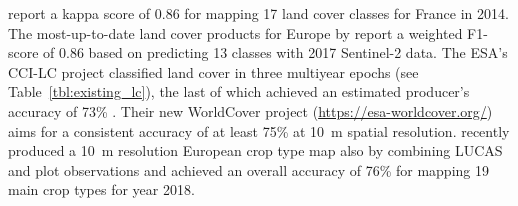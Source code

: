 \citet{inglada2017operational} report a kappa score of 0.86 for mapping 17 land cover classes for France in 2014. The most-up-to-date land cover products for Europe by \citet{malinowski2020} report a weighted F1-score of 0.86 based on predicting 13 classes with 2017 Sentinel-2 data. The ESA's CCI-LC project classified land cover in three multiyear epochs (see Table\@~\ref{tbl:existing_lc}), the last of which achieved an estimated producer's accuracy of 73\% \citep{arino2012global}. Their new WorldCover project (\url{https://esa-worldcover.org/}) aims for a consistent accuracy of at least 75\% at 10~m spatial resolution. \citet{dandrimont2021lucas} recently produced a 10~m resolution European crop type map also by combining LUCAS and plot observations and achieved an overall accuracy of 76\% for mapping 19 main crop types for year 2018.
    
